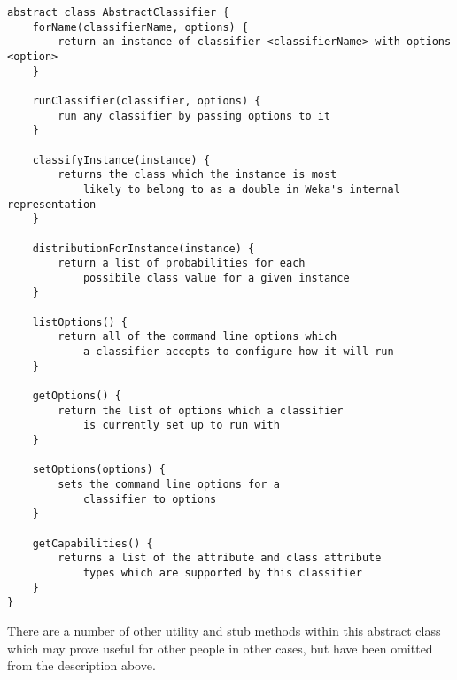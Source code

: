 \begin{footnotesize}
\begin{verbatim}
abstract class AbstractClassifier {
    forName(classifierName, options) {
        return an instance of classifier <classifierName> with options <option>
    }

    runClassifier(classifier, options) {
        run any classifier by passing options to it
    }

    classifyInstance(instance) {
        returns the class which the instance is most 
            likely to belong to as a double in Weka's internal representation
    }

    distributionForInstance(instance) {
        return a list of probabilities for each 
            possibile class value for a given instance
    }

    listOptions() {
        return all of the command line options which 
            a classifier accepts to configure how it will run
    }

    getOptions() {
        return the list of options which a classifier
            is currently set up to run with
    }

    setOptions(options) {
        sets the command line options for a
            classifier to options
    }

    getCapabilities() {
        returns a list of the attribute and class attribute 
            types which are supported by this classifier
    }
}
\end{verbatim}
\end{footnotesize}

There are a number of other utility and stub methods within this abstract class which may prove useful for other people in other cases, but have been omitted from the description above.

